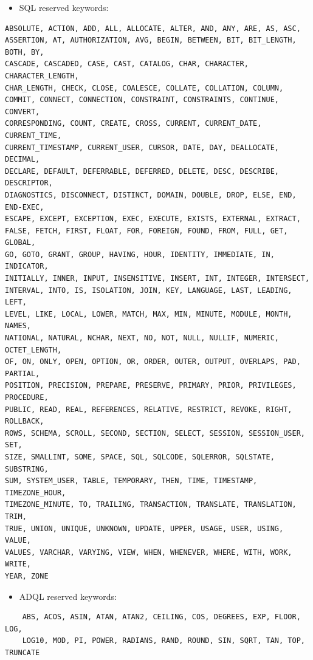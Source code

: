 \documentclass[11pt,a4paper]{ivoa}
\begin{document}
\begin{itemize}
    \item SQL reserved keywords:
\end{itemize}

\begin{verbatim}
ABSOLUTE, ACTION, ADD, ALL, ALLOCATE, ALTER, AND, ANY, ARE, AS, ASC,
ASSERTION, AT, AUTHORIZATION, AVG, BEGIN, BETWEEN, BIT, BIT_LENGTH, BOTH, BY,
CASCADE, CASCADED, CASE, CAST, CATALOG, CHAR, CHARACTER, CHARACTER_LENGTH,
CHAR_LENGTH, CHECK, CLOSE, COALESCE, COLLATE, COLLATION, COLUMN,
COMMIT, CONNECT, CONNECTION, CONSTRAINT, CONSTRAINTS, CONTINUE, CONVERT,
CORRESPONDING, COUNT, CREATE, CROSS, CURRENT, CURRENT_DATE, CURRENT_TIME,
CURRENT_TIMESTAMP, CURRENT_USER, CURSOR, DATE, DAY, DEALLOCATE, DECIMAL,
DECLARE, DEFAULT, DEFERRABLE, DEFERRED, DELETE, DESC, DESCRIBE, DESCRIPTOR,
DIAGNOSTICS, DISCONNECT, DISTINCT, DOMAIN, DOUBLE, DROP, ELSE, END, END-EXEC,
ESCAPE, EXCEPT, EXCEPTION, EXEC, EXECUTE, EXISTS, EXTERNAL, EXTRACT,
FALSE, FETCH, FIRST, FLOAT, FOR, FOREIGN, FOUND, FROM, FULL, GET, GLOBAL,
GO, GOTO, GRANT, GROUP, HAVING, HOUR, IDENTITY, IMMEDIATE, IN, INDICATOR,
INITIALLY, INNER, INPUT, INSENSITIVE, INSERT, INT, INTEGER, INTERSECT,
INTERVAL, INTO, IS, ISOLATION, JOIN, KEY, LANGUAGE, LAST, LEADING, LEFT,
LEVEL, LIKE, LOCAL, LOWER, MATCH, MAX, MIN, MINUTE, MODULE, MONTH, NAMES,
NATIONAL, NATURAL, NCHAR, NEXT, NO, NOT, NULL, NULLIF, NUMERIC, OCTET_LENGTH,
OF, ON, ONLY, OPEN, OPTION, OR, ORDER, OUTER, OUTPUT, OVERLAPS, PAD, PARTIAL,
POSITION, PRECISION, PREPARE, PRESERVE, PRIMARY, PRIOR, PRIVILEGES, PROCEDURE,
PUBLIC, READ, REAL, REFERENCES, RELATIVE, RESTRICT, REVOKE, RIGHT, ROLLBACK,
ROWS, SCHEMA, SCROLL, SECOND, SECTION, SELECT, SESSION, SESSION_USER, SET,
SIZE, SMALLINT, SOME, SPACE, SQL, SQLCODE, SQLERROR, SQLSTATE, SUBSTRING,
SUM, SYSTEM_USER, TABLE, TEMPORARY, THEN, TIME, TIMESTAMP, TIMEZONE_HOUR,
TIMEZONE_MINUTE, TO, TRAILING, TRANSACTION, TRANSLATE, TRANSLATION, TRIM,
TRUE, UNION, UNIQUE, UNKNOWN, UPDATE, UPPER, USAGE, USER, USING, VALUE,
VALUES, VARCHAR, VARYING, VIEW, WHEN, WHENEVER, WHERE, WITH, WORK, WRITE,
YEAR, ZONE
\end{verbatim}

\begin{itemize}
    \item ADQL reserved keywords:
\end{itemize}

\begin{verbatim}
    ABS, ACOS, ASIN, ATAN, ATAN2, CEILING, COS, DEGREES, EXP, FLOOR, LOG,
    LOG10, MOD, PI, POWER, RADIANS, RAND, ROUND, SIN, SQRT, TAN, TOP, TRUNCATE
\end{verbatim}
\end{document}
